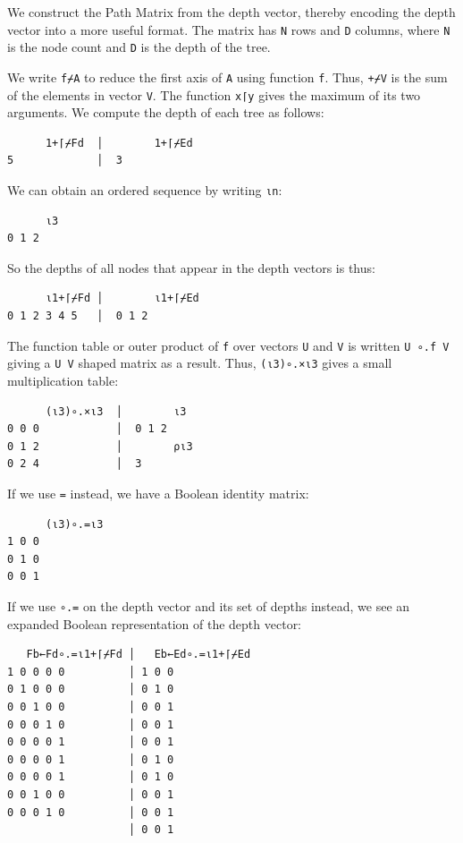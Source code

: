 ﻿\documentclass[numbers,10pt,preprint]{sigplanconf}
\begin{document}
We construct the Path Matrix from the depth vector, thereby encoding the depth vector into a more useful format. The matrix has \verb;N; rows and \verb;D; columns, where \verb;N; is the node count and \verb;D; is the depth of the tree.

We write \verb;f⌿A; to reduce the first axis of \verb;A; using function \verb;f;. Thus, \verb;+⌿V; is the sum of the elements in vector \verb;V;. The function \verb;x⌈y; gives the maximum of its two arguments. We compute the depth of each tree as follows:

\begin{verbatim}
      1+⌈⌿Fd  │        1+⌈⌿Ed
5             │  3
\end{verbatim}

\noindent We can obtain an ordered sequence  by writing \verb;⍳n;:

\begin{verbatim}
      ⍳3
0 1 2
\end{verbatim}

\noindent
So the depths of all nodes that appear in the depth vectors is thus:

\begin{verbatim}
      ⍳1+⌈⌿Fd │        ⍳1+⌈⌿Ed
0 1 2 3 4 5   │  0 1 2
\end{verbatim}

\noindent The function table or outer product of \verb;f; over vectors \verb;U; and \verb;V; is written \verb;U ∘.f V; giving a \verb;U V; shaped matrix as a result. Thus, \verb;(⍳3)∘.×⍳3; gives a small multiplication table:

\begin{verbatim}
      (⍳3)∘.×⍳3  │        ⍳3
0 0 0            │  0 1 2
0 1 2            │        ⍴⍳3
0 2 4            │  3
\end{verbatim}

\noindent If we use \verb;=; instead, we have a Boolean identity matrix:

\begin{verbatim}
      (⍳3)∘.=⍳3
1 0 0
0 1 0
0 0 1
\end{verbatim}

\noindent If we use \verb;∘.=; on the depth vector and its set of depths instead, we see an expanded Boolean representation of the depth vector:

\begin{verbatim}
   Fb←Fd∘.=⍳1+⌈⌿Fd │   Eb←Ed∘.=⍳1+⌈⌿Ed
1 0 0 0 0          │ 1 0 0
0 1 0 0 0          │ 0 1 0
0 0 1 0 0          │ 0 0 1
0 0 0 1 0          │ 0 0 1
0 0 0 0 1          │ 0 0 1
0 0 0 0 1          │ 0 1 0
0 0 0 0 1          │ 0 1 0
0 0 1 0 0          │ 0 0 1
0 0 0 1 0          │ 0 0 1
                   │ 0 0 1
\end{verbatim}
\end{document}
